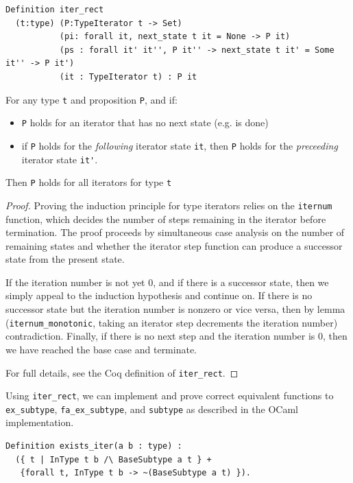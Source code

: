 \documentclass[a4paper,english]{lipics-v2019}
\begin{document}
\begin{theorem}
\begin{small}\begin{verbatim}
Definition iter_rect
  (t:type) (P:TypeIterator t -> Set)
           (pi: forall it, next_state t it = None -> P it)
           (ps : forall it' it'', P it'' -> next_state t it' = Some it'' -> P it')
           (it : TypeIterator t) : P it  
\end{verbatim}\end{small}

For any type \verb|t| and proposition \verb|P|, and if:
\begin{itemize} 
	\item \verb|P| holds for an iterator that has no next state (e.g. is done)
	\item if \verb|P| holds for the \emph{following} iterator state \verb|it|,
	then \verb|P| holds for the \emph{preceeding} iterator state \verb|it'|.
\end{itemize}
Then \verb|P| holds for all iterators for type \verb|t|
\end{theorem}
\begin{proof}
Proving the induction principle for type iterators relies on the \verb|iternum|
function, which decides the number of steps remaining in the iterator before termination.
The proof proceeds by simultaneous case analysis on the number of remaining states and
whether the iterator step function can produce a successor state from the present state.

If the iteration number is not yet 0, and if there is a successor state, then
we simply  appeal to the induction hypothesis and continue on. If there is no
successor state but  the iteration number is nonzero or vice versa, then by
lemma (\verb|iternum_monotonic|, taking an iterator step decrements the
iteration number) contradiction. Finally, if there is no next step and the iteration
number is 0, then we have reached the base case and terminate.

For full details, see the Coq definition of \verb|iter_rect|.
\end{proof}

Using \verb|iter_rect|, we can implement and prove correct equivalent functions
to \verb|ex_subtype|, \verb|fa_ex_subtype|, and \verb|subtype| as described in the
OCaml implementation.

\begin{small}\begin{verbatim}
Definition exists_iter(a b : type) : 
  ({ t | InType t b /\ BaseSubtype a t } +
   {forall t, InType t b -> ~(BaseSubtype a t) }).
\end{verbatim}\end{small}
\end{document}
